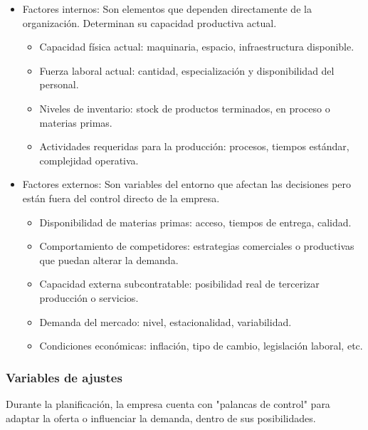 \documentclass[a4paper,oneside,11pt]{article}
\begin{document}
\begin{itemize}
    \item Factores internos: Son elementos que dependen directamente de la organización. Determinan su capacidad productiva actual.
    \begin{itemize}
        \item Capacidad física actual: maquinaria, espacio, infraestructura disponible.
        \item Fuerza laboral actual: cantidad, especialización y disponibilidad del personal.
        \item Niveles de inventario: stock de productos terminados, en proceso o materias primas.
        \item Actividades requeridas para la producción: procesos, tiempos estándar, complejidad operativa.
    \end{itemize}
    \item Factores externos: Son variables del entorno que afectan las decisiones pero están fuera del control directo de la empresa.
    \begin{itemize}
        \item Disponibilidad de materias primas: acceso, tiempos de entrega, calidad.
        \item Comportamiento de competidores: estrategias comerciales o productivas que puedan alterar la demanda.
        \item Capacidad externa subcontratable: posibilidad real de tercerizar producción o servicios.
        \item Demanda del mercado: nivel, estacionalidad, variabilidad.
        \item Condiciones económicas: inflación, tipo de cambio, legislación laboral, etc.
    \end{itemize}
\end{itemize}

\subsubsection{Variables de ajustes}

Durante la planificación, la empresa cuenta con "palancas de control" para adaptar la oferta o influenciar la demanda, dentro de sus posibilidades.
\end{document}
